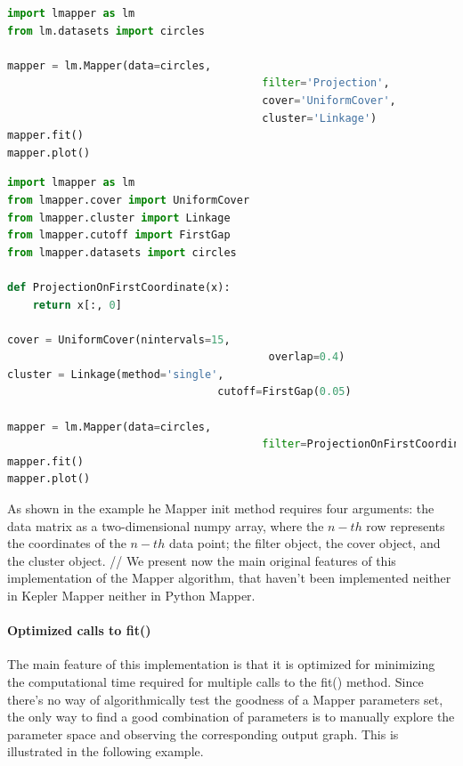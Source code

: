 \begin{lstlisting}[language=Python, caption=Example 3 for the Mapper class. The arguments of the init function can be strings.]
import lmapper as lm
from lm.datasets import circles

mapper = lm.Mapper(data=circles,
										filter='Projection',
										cover='UniformCover',
										cluster='Linkage')
mapper.fit()
mapper.plot()
\end{lstlisting}

\begin{lstlisting}[language=Python, caption=Example 4 for the Mapper class. The filter given to the init function of the Mapper object can be a Python function.]
import lmapper as lm
from lmapper.cover import UniformCover
from lmapper.cluster import Linkage
from lmapper.cutoff import FirstGap
from lmapper.datasets import circles

def ProjectionOnFirstCoordinate(x):
	return x[:, 0]
	
cover = UniformCover(nintervals=15,
										 overlap=0.4)
cluster = Linkage(method='single',
								 cutoff=FirstGap(0.05)

mapper = lm.Mapper(data=circles,
										filter=ProjectionOnFirstCoordinate)
mapper.fit()
mapper.plot()
\end{lstlisting}


As shown in the example he Mapper init method requires four arguments: the data matrix as a two-dimensional numpy array, where the $n-th$ row represents the coordinates of the $n-th$ data point; the filter object, the cover object, and the cluster object. //
We present now the main original features of this implementation of the Mapper algorithm, that haven't been implemented neither in Kepler Mapper neither in Python Mapper.

\paragraph{Optimized calls to fit()}
The main feature of this implementation is that it is optimized for minimizing the computational time required for multiple calls to the fit() method. Since there's no way of algorithmically test the goodness of a Mapper parameters set, the only way to find a good combination of parameters is to manually explore the parameter space and observing the corresponding output graph. This is illustrated in the following example.

